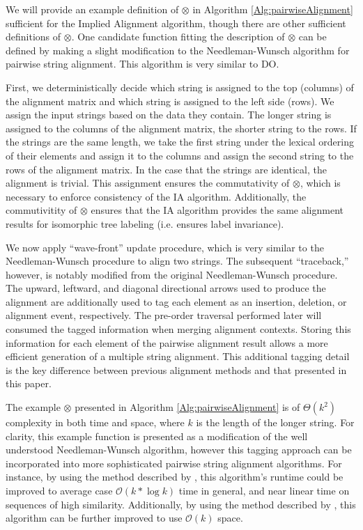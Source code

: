 \documentclass{bmcart}
\begin{document}
We will provide an example definition of $\otimes$ in Algorithm \ref{Alg:pairwiseAlignment} sufficient for the Implied Alignment algorithm, though there are other sufficient definitions of $\otimes$.
One candidate function fitting the description of $\otimes$ can be defined by making a slight modification to the Needleman-Wunsch \citep{Needleman1970} algorithm for pairwise string alignment.
This algorithm is very similar to DO.

First, we deterministically decide which string is assigned to the top (columns) of the alignment matrix and which string is assigned to the left side (rows).
We assign the input strings based on the data they contain.
The longer string is assigned to the columns of the alignment matrix, the shorter string to the rows.
If the strings are the same length, we take the first string under the lexical ordering of their elements and assign it to the columns and assign the second string to the rows of the alignment matrix. 
In the case that the strings are identical, the alignment is trivial.
This assignment ensures the commutativity of $\otimes$, which is necessary to enforce consistency of the IA algorithm.
Additionally, the commutivitity of $\otimes$ ensures that the IA algorithm provides the same alignment results for isomorphic tree labeling (i.e. ensures label invariance).

We now apply ``wave-front'' update procedure, which is very similar to the Needleman-Wunsch procedure to align two strings.
The subsequent ``traceback,'' however, is notably modified from the original Needleman-Wunsch procedure.
The upward, leftward, and diagonal directional arrows used to produce the alignment are additionally used to tag each element as an insertion, deletion, or alignment event, respectively. 
The pre-order traversal performed later will consumed the tagged information when merging alignment contexts.
Storing this information for each element of the pairwise alignment result allows a more efficient generation of a multiple string alignment.
This additional tagging detail is the key difference between previous alignment methods and that presented in this paper.

The example $\otimes$ presented in Algorithm \ref{Alg:pairwiseAlignment}  is of $\Theta\left( k^2 \right)$ complexity in both time and space, where $k$ is the length of the longer string.
For clarity, this example function is presented as a modification of the well understood Needleman-Wunsch algorithm, however this tagging approach can be incorporated into more sophisticated pairwise string alignment algorithms.
For instance, by using the method described by \cite{Ukkonen1985}, this algorithm's runtime could be improved to average case $\mathcal{O}\left( k * \log k \right)$ time in general, and near linear time on sequences of high similarity.
Additionally, by using the method described by \cite{Hirschberg1975}, this algorithm can be further improved to use $\mathcal{O}\left( k \right)$ space.
\end{document}
